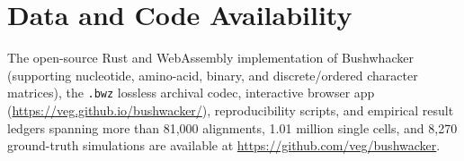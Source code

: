 \documentclass[11pt,a4paper]{article}
\begin{document}
\section*{Data and Code Availability}

The open-source Rust and WebAssembly implementation of Bushwhacker (supporting nucleotide, amino-acid, binary, and discrete/ordered character matrices), the \texttt{.bwz} lossless archival codec, interactive browser app (\url{https://veg.github.io/bushwacker/}), reproducibility scripts, and empirical result ledgers spanning more than 81,000 alignments, 1.01 million single cells, and 8,270 ground-truth simulations are available at \url{https://github.com/veg/bushwacker}.



\end{document}
